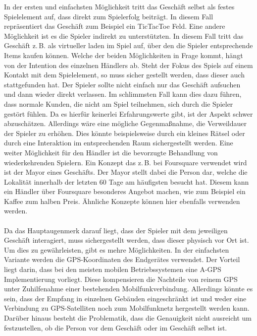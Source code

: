 In der ersten und einfachsten Möglichkeit tritt das Geschäft selbst als festes Spielelement auf, dass direkt zum Spielerfolg beiträgt. In diesem Fall repräsentiert das Geschäft zum Beispiel ein TicTacToe Feld. Eine andere Möglichkeit ist es die Spieler indirekt zu unterstützten. In diesem Fall tritt das Geschäft z.\,B. als virtueller laden im Spiel auf, über den die Spieler entsprechende Items kaufen können.
Welche der beiden Möglichkeiten in Frage kommt, hängt von der Intention des einzelnen Händlers ab. Steht der Fokus des Spiels auf einem Kontakt mit dem Spielelement, so 
muss sicher gestellt werden, dass dieser auch stattgefunden hat. Der Spieler sollte nicht einfach nur das Geschäft aufsuchen und dann wieder direkt verlassen. Im schlimmsten Fall kann dies dazu führen, dass normale Kunden, die nicht am Spiel teilnehmen, sich durch die Spieler gestört fühlen.
Da es hierfür keinerlei Erfahrungswerte gibt, ist der Aspekt schwer abzuschätzen. Allerdings wäre eine mögliche Gegenmaßnahme, die Verweildauer der Spieler zu erhöhen. Dies könnte beispielsweise durch  ein kleines Rätsel oder durch eine Interaktion im entsprechenden Raum  sichergestellt werden.
Eine weiter Möglichkeit für den Händler ist die bevorzugte Behandlung von wiederkehrenden Spielern. Ein Konzept das z.\,B. bei Foursquare verwendet wird ist der Mayor eines Geschäfts. Der Mayor stellt dabei die Person dar, welche die Lokalität innerhalb der letzten 60 Tage am häufigsten besucht hat. Diesem kann ein Händler über Foursquare besonderes Angebot machen, wie zum Beispiel ein Kaffee zum halben Preis.\cite{Lindqvist.2011} Ähnliche Konzepte können hier ebenfalls verwenden werden.
\\\\
Da das Hauptaugenmerk darauf liegt, dass der Spieler mit dem jeweiligen Geschäft interagiert, muss sichergestellt werden, dass dieser physisch vor Ort ist. 
Um dies zu gewährleisten, gibt es mehre Möglichkeiten. In der einfachsten Variante werden die GPS-Koordinaten des Endgerätes verwendet. Der Vorteil liegt darin, dass bei den meisten mobilen Betriebssystemen eine A-GPS Implementierung vorliegt. Diese kompensieren die Nachteile von reinem GPS unter Zuhilfenahme einer bestehenden Mobilfunkverbindung.\cite{Djuknic.2001} Allerdings könnte es sein, dass der Empfang in einzelnen Gebäuden eingeschränkt ist und weder eine Verbindung zu GPS-Satelliten noch zum Mobilfunknetz hergestellt werden kann. Darüber hinaus besteht die Problematik, dass die Genauigkeit nicht ausreicht um festzustellen, ob die Person vor dem Geschäft oder im Geschäft selbst ist.
